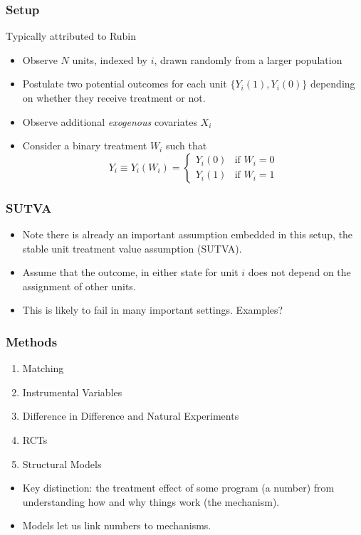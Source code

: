 \begin{frame}
  \frametitle{Setup}
  Typically attributed to Rubin
  \begin{itemize}
  \item Observe $N$ units, indexed by $i$, drawn randomly from a larger population
  \item Postulate two \alert{potential outcomes} for each unit $\{Y_i(1), Y_i(0)\}$ depending on whether they receive treatment or not.
  \item Observe additional \textit{exogenous} covariates $X_i$
  \item Consider a binary treatment $W_i$ such that 
  \begin{equation*}
    Y_{i} \equiv Y_i(W_i) = 
      \begin{cases}
        Y_i(0) & \text{if $W_i=0$}\\
        Y_i(1) & \text{if $W_i=1$}
      \end{cases}       
  \end{equation*}
\end{itemize}
\end{frame}

\begin{frame}
  \frametitle{SUTVA}
  \begin{itemize}
  \item Note there is already an important assumption embedded in this setup, the stable unit treatment value assumption (\alert{SUTVA}). 
  \item Assume that the outcome, in either state for unit $i$ does not depend on the assignment of other units.   
  \item This is likely to fail in many important settings. Examples?
\end{itemize}
\end{frame}

\begin{frame}
  \frametitle{Methods}
  \begin{enumerate}
  \item Matching
  \item Instrumental Variables
  \item Difference in Difference and Natural Experiments
  \item RCTs
  \item Structural Models
  \end{enumerate}
  \begin{itemize}
  \item Key distinction: the treatment effect of some program (a number) from understanding how and why things work (the mechanism).
  \item Models let us link numbers to mechanisms.
  \end{itemize}
\end{frame}

